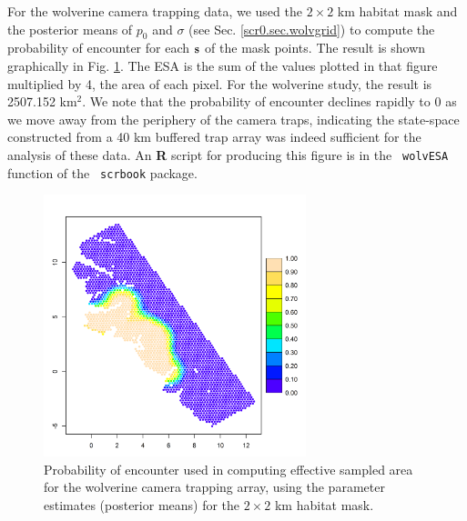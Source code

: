 {For the wolverine camera trapping data, we used the
$2 \times 2$ km habitat mask and the posterior means of $p_{0}$ and $\sigma$ (see
Sec. \ref{scr0.sec.wolvgrid}) to compute the
probability of encounter for each ${\bf s}$ of the mask points. The
result is shown graphically in Fig. \ref{scr0.fig.esa}. The ESA
is the sum of the values plotted in that figure multiplied by 4, the
area of each pixel. For the wolverine study, the result is
2507.152 km$^2$. We note that the probability of encounter declines
rapidly to 0 as we move away from the periphery of the camera traps,
indicating the state-space constructed from a 40 km buffered trap
array was indeed sufficient for the analysis of these data.
An {\bf R} script for producing this figure is in the \mbox{\tt
  wolvESA} function of the  \mbox{\tt
  scrbook} package.

\begin{figure}[ht]
\begin{center}
\includegraphics[height=3in]{Ch5-SCR0/figs/wolv_esa}
\end{center}
\caption{Probability of encounter used in computing effective sampled
  area for the wolverine camera trapping array, using the parameter
  estimates (posterior means) for the $2 \times 2$ km habitat mask.  }
\label{scr0.fig.esa}
\end{figure}

















}
